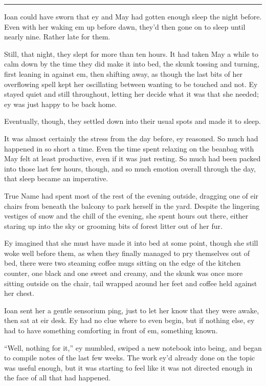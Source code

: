 \begin{center}\rule{0.5\linewidth}{0.5pt}\end{center}

Ioan could have sworn that ey and May had gotten enough sleep the night before. Even with her waking em up before dawn, they'd then gone on to sleep until nearly nine. Rather late for them.

Still, that night, they slept for more than ten hours. It had taken May a while to calm down by the time they did make it into bed, the skunk tossing and turning, first leaning in against em, then shifting away, as though the last bits of her overflowing spell kept her oscillating between wanting to be touched and not. Ey stayed quiet and still throughout, letting her decide what it was that she needed; ey was just happy to be back home.

Eventually, though, they settled down into their usual spots and made it to sleep.

It was almost certainly the stress from the day before, ey reasoned. So much had happened in so short a time. Even the time spent relaxing on the beanbag with May felt at least productive, even if it was just resting. So much had been packed into those last few hours, though, and so much emotion overall through the day, that sleep became an imperative.

True Name had spent most of the rest of the evening outside, dragging one of eir chairs from beneath the balcony to park herself in the yard. Despite the lingering vestiges of snow and the chill of the evening, she spent hours out there, either staring up into the sky or grooming bits of forest litter out of her fur.

Ey imagined that she must have made it into bed at some point, though she still woke well before them, as when they finally managed to pry themselves out of bed, there were two steaming coffee mugs sitting on the edge of the kitchen counter, one black and one sweet and creamy, and the skunk was once more sitting outside on the chair, tail wrapped around her feet and coffee held against her chest.

Ioan sent her a gentle sensorium ping, just to let her know that they were awake, then sat at eir desk. Ey had no clue where to even begin, but if nothing else, ey had to have something comforting in front of em, something known.

``Well, nothing for it,'' ey mumbled, swiped a new notebook into being, and began to compile notes of the last few weeks. The work ey'd already done on the topic was useful enough, but it was starting to feel like it was not directed enough in the face of all that had happened.

